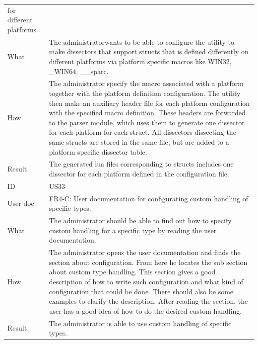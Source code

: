 \begin{table}[htbp]
{\begin{tabularx}{1.2\textwidth}{l X}
	for different platforms. \\
	What & The administratorwants to be able to configure the \gls{utility} to make \glspl{dissector} that support \glspl{struct} that is defined differently on different platforms via platform specific
	macros like WIN32, \_WIN64, \_\_sparc. \\
	How & The administrator specify the macro associated with a platform together with the platform definition configuration. The \gls{utility} then make an auxiliary \gls{header} file for each 
	platform configuration with the specified macro definition. These \glspl{header} are forwarded to the \gls{parser} module, which uses them to generate
  	one \gls{dissector} for each platform for each \gls{struct}. All \glspl{dissector} dissecting the same \glspl{struct} are stored in the same file, but are added to a platform specific \gls{dissector} table. \\
	Result & The generated \Gls{lua} files corresponding to \glspl{struct} includes one \gls{dissector} for each platform defined in the configuration file. \\
	\midrule
	ID & US33 \\
	User doc & FR4-C: User documentation for configurating custom handling of specific types. \\
	What & The administrator should be able to find out how to specify custom handling for a specific type by reading the user documentation. \\
	How &	 The administrator opens the user documentation and finds the section about configuration. From here he locates the sub section about custom type handling. 
	This section gives a good description of how to write such configuration and what kind of configuration that could be done. There should also be some examples to clarify
	the description. After reading the section, the user has a good idea of how to do the desired custom handling. \\ 
	Result & The administrator is able to use custom handling of specific types. \\
	\midrule

\end{tabularx}}
\end{table}

